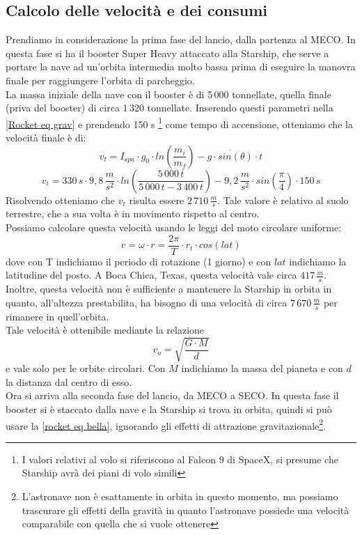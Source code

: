 \subsection{Calcolo delle velocità e dei consumi}
Prendiamo in considerazione la prima fase del lancio, dalla partenza al MECO. In questa fase si ha il booster Super Heavy attaccato alla Starship, che serve a portare la nave ad un'orbita intermedia molto bassa prima di eseguire la manovra finale per raggiungere l'orbita di parcheggio.\\
La massa iniziale della nave con il booster è di 5\,000 tonnellate, quella finale (priva del booster) di circa 1\,320 tonnellate.
Inserendo questi parametri nella \ref{Rocket eq grav} e prendendo 150 s \footnote{I valori relativi al volo si riferiscono al Falcon 9 di SpaceX, si presume che Starship avrà dei piani di volo simili} come tempo di accensione, otteniamo che la velocità finale è di:
$$
v_t = I_{spa} \cdot g_0 \cdot ln\left(\frac{m_i}{m_f}\right) - \overline{g \cdot sin(\theta)} \cdot t
$$
$$
v_t = 330\,s \cdot 9,8\,\frac{m}{s^2} \cdot ln\left(\frac{5\,000\,t}{5\,000\,t - 3\,400\,t}\right) - 9,2\,\frac{m}{s^2} \cdot sin\left(\frac{\pi}{4}\right) \cdot 150\,s
$$
Risolvendo otteniamo che $v_t$ risulta essere $2\,710\,\frac{m}{s}$. Tale valore è relativo al suolo terrestre, che a sua volta è in movimento rispetto al centro.\\
Possiamo calcolare questa velocità usando le leggi del moto circolare uniforme:\\
$$
v = \omega \cdot r = \frac{2 \pi}{T} \cdot r_t \cdot cos(lat)
$$
dove con T indichiamo il periodo di rotazione (1 giorno) e con $lat$ indichiamo la latitudine del posto.
A Boca Chica, Texas, questa velocità vale circa $417\,\frac{m}{s}$.\\
Inoltre, questa velocità non è sufficiente a mantenere la Starship in orbita in quanto, all'altezza prestabilita, ha bisogno di una velocità di circa 
$7\,670\,\frac{m}{s}$ per rimanere in quell'orbita.\\
Tale velocità è ottenibile mediante la relazione
$$
v_o = \sqrt{\frac{G \cdot M}{d}}
$$
e vale solo per le orbite circolari. Con $M$ indichiamo la massa del pianeta e con $d$ la distanza dal centro di esso.\\
Ora si arriva alla seconda fase del lancio, da MECO a SECO. In questa fase il booster si è staccato dalla nave e la Starship si trova in orbita, quindi si può usare la \ref{rocket eq bella}, ignorando gli effetti di attrazione gravitazionale\footnote{L'astronave non è esattamente in orbita in questo momento, ma possiamo trascurare gli effetti della gravità in quanto l'astronave possiede una velocità comparabile con quella che si vuole ottenere}.
